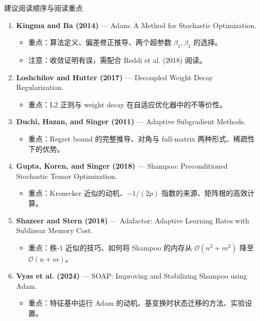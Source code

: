 \documentclass[aspectratio=169,10pt]{ctexbeamer}
\begin{document}
\begin{frame}{建议阅读顺序与阅读重点}
\begin{enumerate}
  \item \textbf{Kingma and Ba (2014)} — Adam: A Method for Stochastic Optimization.
  \begin{itemize}
    \item 重点：算法定义、偏差修正推导、两个超参数 $\beta_1,\beta_2$ 的选择。
    \item 注意：收敛证明有误，需配合 Reddi et al. (2018) 阅读。
  \end{itemize}
  \item \textbf{Loshchilov and Hutter (2017)} — Decoupled Weight Decay Regularization.
  \begin{itemize}
    \item 重点：L2 正则与 weight decay 在自适应优化器中的不等价性。
  \end{itemize}
  \item \textbf{Duchi, Hazan, and Singer (2011)} — Adaptive Subgradient Methods.
  \begin{itemize}
    \item 重点：Regret bound 的完整推导、对角与 full-matrix 两种形式、稀疏性下的优势。
  \end{itemize}
  \item \textbf{Gupta, Koren, and Singer (2018)} — Shampoo: Preconditioned Stochastic Tensor Optimization.
  \begin{itemize}
    \item 重点：Kronecker 近似的动机、$-1/(2p)$ 指数的来源、矩阵根的高效计算。
  \end{itemize}
  \item \textbf{Shazeer and Stern (2018)} — Adafactor: Adaptive Learning Rates with Sublinear Memory Cost.
  \begin{itemize}
    \item 重点：秩-1 近似的技巧、如何将 Shampoo 的内存从 $\mathcal{O}(n^2+m^2)$ 降至 $\mathcal{O}(n+m)$。
  \end{itemize}
  \item \textbf{Vyas et al. (2024)} — SOAP: Improving and Stabilizing Shampoo using Adam.
  \begin{itemize}
    \item 重点：特征基中运行 Adam 的动机、基变换时状态迁移的方法、实验设置。
  \end{itemize}
\end{enumerate}
\end{frame}
\end{document}
